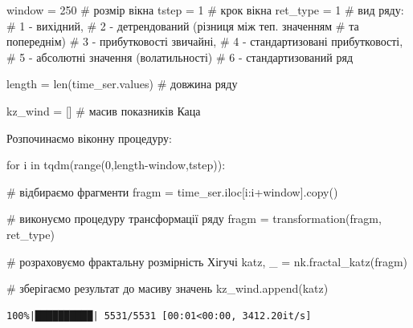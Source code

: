 \documentclass[
  letterpaper,
]{report}
\newenvironment{Shaded}{\begin{snugshade}}{\end{snugshade}}
\newcommand{\BuiltInTok}[1]{\textcolor[rgb]{0.00,0.23,0.31}{#1}}
\newcommand{\CommentTok}[1]{\textcolor[rgb]{0.37,0.37,0.37}{#1}}
\newcommand{\ControlFlowTok}[1]{\textcolor[rgb]{0.00,0.23,0.31}{#1}}
\newcommand{\DecValTok}[1]{\textcolor[rgb]{0.68,0.00,0.00}{#1}}
\newcommand{\KeywordTok}[1]{\textcolor[rgb]{0.00,0.23,0.31}{#1}}
\newcommand{\NormalTok}[1]{\textcolor[rgb]{0.00,0.23,0.31}{#1}}
\newcommand{\OperatorTok}[1]{\textcolor[rgb]{0.37,0.37,0.37}{#1}}
\begin{document}
\begin{Shaded}
\begin{Highlighting}[]
\NormalTok{window }\OperatorTok{=} \DecValTok{250}    \CommentTok{\# розмір вікна}
\NormalTok{tstep }\OperatorTok{=} \DecValTok{1}       \CommentTok{\# крок вікна}
\NormalTok{ret\_type }\OperatorTok{=} \DecValTok{1}    \CommentTok{\# вид ряду: }
                \CommentTok{\# 1 {-} вихідний, }
                \CommentTok{\# 2 {-} детрендований (різниця між теп. значенням }
                                                \CommentTok{\# та попереднім)}
                \CommentTok{\# 3 {-} прибутковості звичайні, }
                \CommentTok{\# 4 {-} стандартизовані прибутковості, }
                \CommentTok{\# 5 {-} абсолютні значення (волатильності)}
                \CommentTok{\# 6 {-} стандартизований ряд}

\NormalTok{length }\OperatorTok{=} \BuiltInTok{len}\NormalTok{(time\_ser.values)      }\CommentTok{\# довжина ряду}

\NormalTok{kz\_wind }\OperatorTok{=}\NormalTok{ []                      }\CommentTok{\# масив показників Каца}
\end{Highlighting}
\end{Shaded}

Розпочинаємо віконну процедуру:

\begin{Shaded}
\begin{Highlighting}[]
\ControlFlowTok{for}\NormalTok{ i }\KeywordTok{in}\NormalTok{ tqdm(}\BuiltInTok{range}\NormalTok{(}\DecValTok{0}\NormalTok{,length}\OperatorTok{{-}}\NormalTok{window,tstep)):}
    
    \CommentTok{\# відбираємо фрагменти}
\NormalTok{    fragm }\OperatorTok{=}\NormalTok{ time\_ser.iloc[i:i}\OperatorTok{+}\NormalTok{window].copy()  }

    \CommentTok{\# виконуємо процедуру трансформації ряду }
\NormalTok{    fragm }\OperatorTok{=}\NormalTok{ transformation(fragm, ret\_type)}

    \CommentTok{\# розраховуємо фрактальну розмірність Хігучі}
\NormalTok{    katz, \_ }\OperatorTok{=}\NormalTok{ nk.fractal\_katz(fragm)}

    \CommentTok{\# зберігаємо результат до масиву значень}
\NormalTok{    kz\_wind.append(katz)}
\end{Highlighting}
\end{Shaded}

\begin{verbatim}
100%|██████████| 5531/5531 [00:01<00:00, 3412.20it/s]
\end{verbatim}
\end{document}
